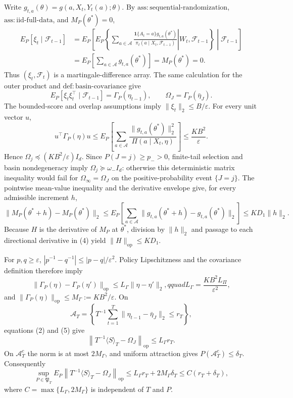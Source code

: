 Write \(g_{t,a}(\theta)=g(a,X_t,Y_t(a);\theta)\). By \(\mathrm{ass:sequential\text{-}randomization}\), \(\mathrm{ass:iid\text{-}full\text{-}data}\), and \(M_P(\theta^*)=0\),
\[
\begin{aligned}
E_P[\xi_t\mid\mathcal F_{t-1}]
&=E_P\!\left[E_P\!\left\{\left.\sum_{a\in\mathcal A}
 \frac{\mathbf 1\{A_t=a\}g_{t,a}(\theta^*)}
 {\pi_t(a\mid X_t,\mathcal F_{t-1})}
 \right|W_t,\mathcal F_{t-1}\right\}\middle|\mathcal F_{t-1}\right]\\
&=E_P\!\left[\sum_{a\in\mathcal A}g_{t,a}(\theta^*)\right]
=M_P(\theta^*)=0.
\end{aligned}
\tag{1}
\]
Thus \((\xi_t,\mathcal F_t)\) is a martingale-difference array. The same calculation for the outer product and \(\mathrm{def:basin\text{-}covariance}\) give
\[
 E_P[\xi_t\xi_t^\top\mid\mathcal F_{t-1}]
 =\Gamma_P(\eta_{t-1}),\qquad \Omega_J=\Gamma_P(\bar\eta_J).
\tag{2}
\]
The bounded-score and overlap assumptions imply \(\|\xi_t\|_2\le B/\varepsilon\). For every unit vector \(u\),
\[
 u^\top\Gamma_P(\eta)u
 \le E_P\!\left[\sum_{a\in\mathcal A}
 \frac{\|g_{t,a}(\theta^*)\|_2^2}{\Pi(a\mid X_t,\eta)}\right]
 \le \frac{KB^2}{\varepsilon}.
\tag{3}
\]
Hence \(\Omega_j\preceq(KB^2/\varepsilon)I_d\). Since \(P(J=j)\ge p_->0\), finite-tail selection and basin nondegeneracy imply \(\Omega_j\succeq\omega_-I_d\): otherwise this deterministic matrix inequality would fail for \(\Omega_\infty=\Omega_J\) on the positive-probability event \(\{J=j\}\). The pointwise mean-value inequality and the derivative envelope give, for every admissible increment \(h\),
\[
 \|M_P(\theta^*+h)-M_P(\theta^*)\|_2
 \le E_P\!\left[\sum_{a\in\mathcal A}
 \|g_{t,a}(\theta^*+h)-g_{t,a}(\theta^*)\|_2\right]
 \le KD_1\|h\|_2.
\tag{4}
\]
Because \(H\) is the derivative of \(M_P\) at \(\theta^*\), division by \(\|h\|_2\) and passage to each directional derivative in (4) yield \(\|H\|_{\mathrm{op}}\le KD_1\).

For \(p,q\ge\varepsilon\), \(|p^{-1}-q^{-1}|\le |p-q|/\varepsilon^2\). Policy Lipschitzness and the covariance definition therefore imply
\[
 \|\Gamma_P(\eta)-\Gamma_P(\eta')\|_{\mathrm{op}}
 \le L_\Gamma\|\eta-\eta'\|_2,qquad
 L_\Gamma=\frac{KB^2L_\Pi}{\varepsilon^2},
\tag{5}
\]
and \(\|\Gamma_P(\eta)\|_{\mathrm{op}}\le M_\Gamma:=KB^2/\varepsilon\). On
\[
 \mathcal A_T=\left\{T^{-1}\sum_{t=1}^T
 \|\eta_{t-1}-\bar\eta_J\|_2\le r_T\right\},
\]
equations (2) and (5) give
\[
 \left\|T^{-1}\langle S\rangle_T-\Omega_J\right\|_{\mathrm{op}}
 \le L_\Gamma r_T.
\tag{6}
\]
On \(\mathcal A_T^c\) the norm is at most \(2M_\Gamma\), and uniform attraction gives \(P(\mathcal A_T^c)\le\delta_T\). Consequently
\[
 \sup_{P\in\mathfrak P_T}E_P\!\left\|T^{-1}\langle S\rangle_T-
 \Omega_J\right\|_{\mathrm{op}}
 \le L_\Gamma r_T+2M_\Gamma\delta_T
 \le C(r_T+\delta_T),
\tag{7}
\]
where \(C=\max\{L_\Gamma,2M_\Gamma\}\) is independent of \(T\) and \(P\).

